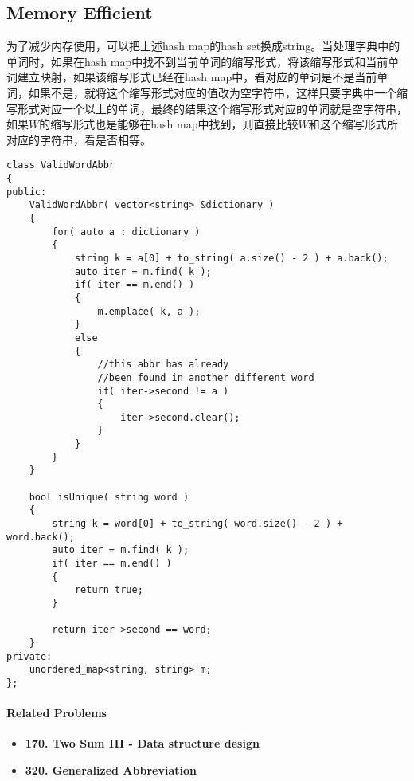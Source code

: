 \subsection{Memory Efficient}
为了减少内存使用，可以把上述hash map的hash set换成string。当处理字典中的单词时，如果在hash map中找不到当前单词的缩写形式，将该缩写形式和当前单词建立映射，如果该缩写形式已经在hash map中，看对应的单词是不是当前单词，如果不是，就将这个缩写形式对应的值改为空字符串，这样只要字典中一个缩写形式对应一个以上的单词，最终的结果这个缩写形式对应的单词就是空字符串，如果$W$的缩写形式也是能够在hash map中找到，则直接比较$W$和这个缩写形式所对应的字符串，看是否相等。
\begin{lstlisting}[style=customc, caption={Memory Efficient}]
class ValidWordAbbr
{
public:
    ValidWordAbbr( vector<string> &dictionary )
    {
        for( auto a : dictionary )
        {
            string k = a[0] + to_string( a.size() - 2 ) + a.back();
            auto iter = m.find( k );
            if( iter == m.end() )
            {
                m.emplace( k, a );
            }
            else
            {
                //this abbr has already
                //been found in another different word
                if( iter->second != a )
                {
                    iter->second.clear();
                }
            }
        }
    }

    bool isUnique( string word )
    {
        string k = word[0] + to_string( word.size() - 2 ) + word.back();
        auto iter = m.find( k );
        if( iter == m.end() )
        {
            return true;
        }

        return iter->second == word;
    }
private:
    unordered_map<string, string> m;
};
\end{lstlisting}

\paragraph{Related Problems}
\begin{itemize}
\item \textbf{170. Two Sum III - Data structure design}
\item \textbf{320. Generalized Abbreviation}
\end{itemize}